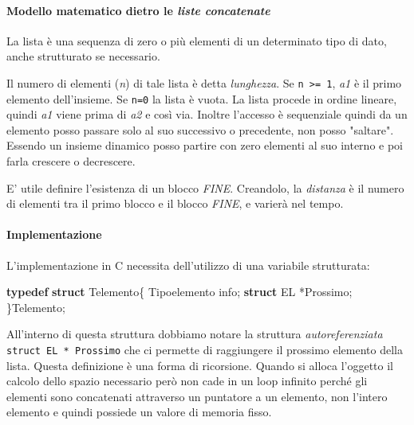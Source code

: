 \documentclass[
]{article}
\newenvironment{Shaded}{}{}
\newcommand{\KeywordTok}[1]{\textcolor[rgb]{0.00,0.44,0.13}{\textbf{#1}}}
\newcommand{\NormalTok}[1]{#1}
\begin{document}
\hypertarget{header-n1174}{%
\paragraph{\texorpdfstring{Modello matematico dietro le \emph{liste
concatenate}}{Modello matematico dietro le liste concatenate}}\label{header-n1174}}

La lista è una sequenza di zero o più elementi di un determinato tipo di
dato, anche strutturato se necessario.

Il numero di elementi (\emph{n}) di tale lista è detta \emph{lunghezza}.
Se \texttt{n\ \textgreater{}=\ 1}, \emph{a1} è il primo elemento
dell'insieme. Se \texttt{n=0} la lista è vuota. La lista procede in
ordine lineare, quindi \emph{a1} viene prima di \emph{a2} e così via.
Inoltre l'accesso è sequenziale quindi da un elemento posso passare solo
al suo successivo o precedente, non posso "saltare". Essendo un insieme
dinamico posso partire con zero elementi al suo interno e poi farla
crescere o decrescere.

E' utile definire l'esistenza di un blocco \emph{FINE}. Creandolo, la
\emph{distanza} è il numero di elementi tra il primo blocco e il blocco
\emph{FINE}, e varierà nel tempo.

\hypertarget{header-n1179}{%
\paragraph{Implementazione}\label{header-n1179}}

L'implementazione in C necessita dell'utilizzo di una variabile
strutturata:

\begin{Shaded}
\begin{Highlighting}[]
\KeywordTok{typedef} \KeywordTok{struct}\NormalTok{ Telemento\{}
\NormalTok{	Tipoelemento info;}
	\KeywordTok{struct}\NormalTok{ EL *Prossimo;}
\NormalTok{\}Telemento;}
\end{Highlighting}
\end{Shaded}

All'interno di questa struttura dobbiamo notare la struttura
\emph{autoreferenziata} \texttt{struct\ EL\ *\ Prossimo} che ci permette
di raggiungere il prossimo elemento della lista. Questa definizione è
una forma di ricorsione. Quando si alloca l'oggetto il calcolo dello
spazio necessario però non cade in un loop infinito perché gli elementi
sono concatenati attraverso un puntatore a un elemento, non l'intero
elemento e quindi possiede un valore di memoria fisso.
\end{document}
